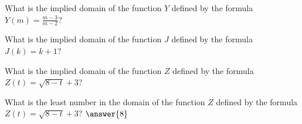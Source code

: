 \documentclass{ximera}
\begin{document}
\begin{exercise}
What is the implied domain of the function $Y$ defined by the formula $Y(m) = \frac{m-3}{m-2}$?

\begin{multipleChoice}
\choice{$(-\infty, \infty)$}
\end{multipleChoice}

\end{exercise}





\begin{exercise}
What is the implied domain of the function $J$ defined by the formula $J(k) = k+1$?

\begin{multipleChoice}
\choice[correct]{$(-\infty, \infty)$}
\end{multipleChoice}

\end{exercise}





\begin{exercise}
What is the implied domain of the function $Z$ defined by the formula $Z(t) = \sqrt{8-t} + 3$?

\begin{multipleChoice}
\choice{$(-\infty, \infty)$}
\end{multipleChoice}

\end{exercise}



\begin{exercise}
What is the least number in the domain of the function $Z$ defined by the formula $Z(t) = \sqrt{8-t} + 3$? 
$\answer{8}$


\end{exercise}
\end{document}
